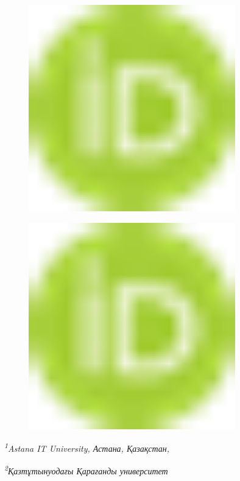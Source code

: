 \begin{figure}[H]
	\centering
	\includegraphics[width=0.8\textwidth]{media/ict/image1}
	\caption*{}
\end{figure}

\begin{figure}[H]
	\centering
	\includegraphics[width=0.8\textwidth]{media/ict/image1}
	\caption*{}
\end{figure}


\emph{\textsuperscript{1}Astana IT University, Астана, Қазақстан,}

\emph{\textsuperscript{2}Қазтұтынуодағы Қарағанды университет}

